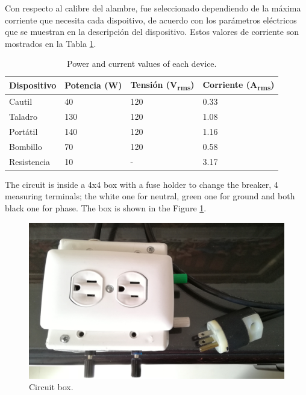 \documentclass[journal]{IEEEtran}
\begin{document}

Con respecto al calibre del alambre, fue seleccionado 
dependiendo de la máxima corriente que necesita cada 
dispoitivo, de acuerdo con los parámetros eléctricos 
que se muestran en la descripción del dispositivo. Estos
valores de corriente son mostrados en la Tabla
\ref{current_table}. \\

\begin{table}
\centering
\caption{Power and current values of each device.}
\begin{tabular}{|l|p{1.2cm}|p{1.5cm}|p{1.5cm}|}
\hline 
Dispositivo & Potencia (W) & Tensión (V\textsubscript{rms}) 
& Corriente (A\textsubscript{rms}) \\ \hline 
Cautil 	&  40	& 120 	& 0.33 \\ \hline 
Taladro 		& 130	& 120   & 1.08 \\ \hline 
Portátil 		& 140 	& 120   & 1.16 \\ \hline 
Bombillo		& 70  	& 120   & 0.58 \\ \hline 
Resistencia & 10 & - & 3.17 \\ \hline
\end{tabular}
\label{current_table}
\end{table}

The circuit is inside a 4x4 box with a fuse holder to 
change the breaker, 4 measuring terminals; the white 
one for neutral, green one for ground and 
both black one for phase. The box is shown in the 
Figure \ref{circuit_box}. \\

\begin{figure}[h]
\centering
\includegraphics[clip,width=\columnwidth]{circuit_box.png}
\caption{Circuit box.}
\label{circuit_box}
\end{figure}
\end{document}
